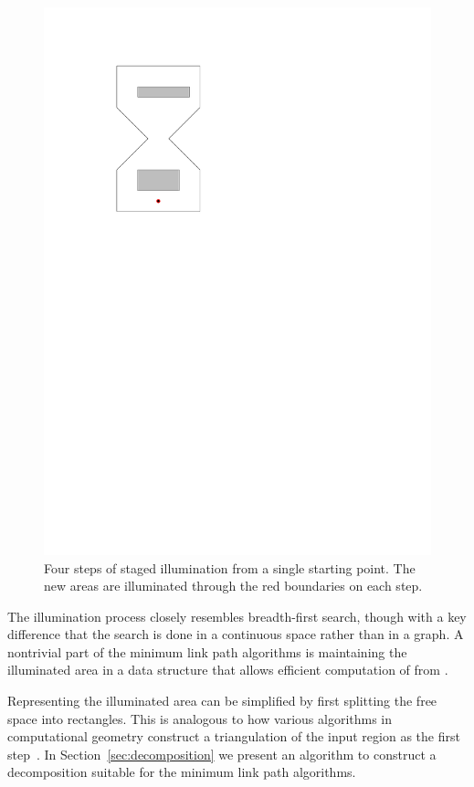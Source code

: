 \documentclass[english,gradu]{tktltiki2018}
\begin{document}
\begin{figure}
	\includegraphics[scale=0.5,page=4]{fig/staged}
	\caption{Four steps of staged illumination from a single starting point. The new areas are illuminated through the red boundaries on each step.}\label{fig:staged}
\end{figure}

The illumination process closely resembles breadth-first search, though with a key difference that the search is done in a continuous space rather than in a graph.
A nontrivial part of the minimum link path algorithms is maintaining the illuminated area in a data structure that allows efficient computation of  from .

Representing the illuminated area can be simplified by first splitting the free space into rectangles.
This is analogous to how various algorithms in computational geometry construct a triangulation of the input region as the first step~\cite{handbook}.
In Section~\ref{sec:decomposition} we present an algorithm to construct a decomposition suitable for the minimum link path algorithms.
\end{document}
